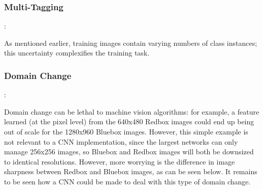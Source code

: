 \documentclass[a4paper,11pt]{article}
\begin{document}
\subsubsection{Multi-Tagging}:

As mentioned earlier, training images contain varying numbers of class instances; this uncertainty complexifies the training task.

\subsubsection{Domain Change}:

Domain change can be lethal to machine vision algorithms: for example, a feature learned (at the pixel level) from the 640x480 Redbox images could end up being out of scale for the 1280x960 Bluebox images. However, this simple example is not relevant to a CNN implementation, since the largest networks can only manage 256x256 images, so Bluebox and Redbox images will both be downsized to identical resolutions. However, more worrying is the difference in image sharpness between Redbox and Bluebox images, as can be seen below. It remains to be seen how a CNN could be made to deal with this type of domain change.
\end{document}
